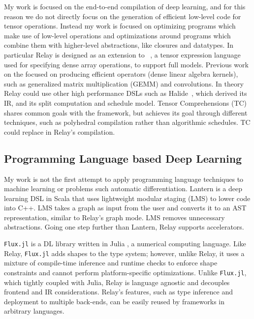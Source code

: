 My work is focused on the end-to-end compilation of deep learning, and for
  this reason we do not directly focus on the generation of efficient low-level code for
  tensor operations.
Instead my work is focused on optimizing programs which make use of low-level operations
  and optimizations around programs which combine them with higher-level abstractions,
  like closures and datatypes.
In particular Relay is designed as an extension to \tvm~\citep{tvm_osdi18},
  a tensor expression language used for specifying dense array
  operations, to support full models.
Previous work on the \tvm focused on producing efficient operators
  (dense linear algebra kernels), such as generalized matrix multiplication (GEMM) and convolutions.
In theory Relay could use other high performance DSLs such as Halide~\citep{halide},
    which \tvm derived its IR, and its split computation and schedule model.
Tensor Comprehensions (TC) shares common goals with the \tvm framework, but achieves its goal
through different techniques, such as polyhedral compilation rather than algorithmic
schedules. TC could replace \tvm in Relay{}'s compilation.

\subsection{Programming Language based Deep Learning}

My work is not the first attempt to apply programming language
    techniques to machine learning or problems such automatic differentiation.
Lantern \citep{lantern} is a deep learning DSL in Scala
    that uses lightweight modular staging (LMS) to lower code into C++.
LMS takes a graph as input from the user and converts it to an AST
    representation, similar to Relay's graph mode.
LMS removes unnecessary abstractions.
Going one step further than Lantern,
    Relay supports accelerators.

\verb|Flux.jl| \citep{fluxjl} is a DL library written in Julia \citep{julia}, a numerical
computing language. Like Relay, \verb|Flux.jl| adds shapes to the type system; however, unlike Relay, it
uses a mixture of compile-time inference and runtime checks to enforce shape constraints
\citep{jlmlpl} and cannot perform platform-specific optimizations. Unlike \verb|Flux.jl|, which
tightly coupled with Julia, Relay is language agnostic and decouples frontend and IR
considerations.
Relay's features, such as type inference and deployment to multiple back-ends, can
    be easily reused by frameworks in arbitrary languages.

